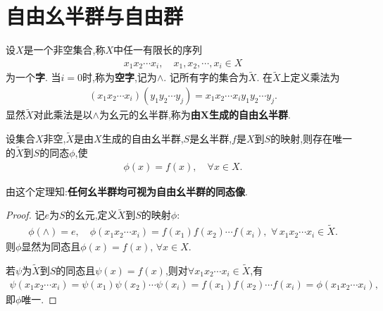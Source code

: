 \documentclass[../../main.tex]{subfiles}%
\begin{document}
\section{自由幺半群与自由群}

\begin{definition}[自由幺半群]
设$X$是一个非空集合,称$X$中任一有限长的序列
\begin{align*}
x_1x_2\cdots x_i,\quad x_1,x_2,\cdots,x_i\in X
\end{align*}
为一个\textbf{字}. 当$i=0$时,称为\textbf{空字},记为$\land$. 记所有字的集合为$\widetilde{X}$. 在$\widetilde{X}$上定义乘法为
\begin{align*}
(x_1x_2\cdots x_i)(y_1y_2\cdots y_j) = x_1x_2\cdots x_iy_1y_2\cdots y_j.
\end{align*}
显然$\widetilde{X}$对此乘法是以$\land$为幺元的幺半群,称为\textbf{由$\boldsymbol{X}$生成的自由幺半群}.
\end{definition}

\begin{theorem}\label{theorem:抽象代数--定理4.8.1}
设集合$X$非空,$\widetilde{X}$是由$X$生成的自由幺半群,$S$是幺半群,$f$是$X$到$S$的映射,则存在唯一的$\widetilde{X}$到$S$的同态$\phi$,使
\begin{align*}
\phi(x) = f(x),\quad \forall x\in X.
\end{align*}
\end{theorem}
\begin{remark}
由这个定理知:\textbf{任何幺半群均可视为自由幺半群的同态像}.
\end{remark}
\begin{proof}
记$e$为$S$的幺元,定义$\widetilde{X}$到$S$的映射$\phi$:
\begin{align*}
\phi(\land)=e,\quad \phi(x_1x_2\cdots x_i)=f(x_1)f(x_2)\cdots f(x_i),\,\,\forall \, x_1x_2\cdots x_i\in \widetilde{X}.
\end{align*}
则$\phi$显然为同态且$\phi(x) = f(x),\,\forall x\in X.$

若$\psi$为$\widetilde{X}$到$S$的同态且$\psi(x)=f(x)$,则对$\forall x_1x_2\cdots x_i\in \widetilde{X}$,有
\begin{align*}
\psi(x_1x_2\cdots x_i) = \psi(x_1)\psi(x_2)\cdots \psi(x_i) = f(x_1)f(x_2)\cdots f(x_i) = \phi(x_1x_2\cdots x_i),
\end{align*}
即$\phi$唯一.
\end{proof}
\end{document}

